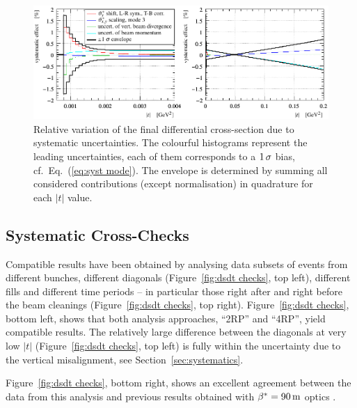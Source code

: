 \begin{figure}
\begin{center}
\includegraphics{fig/systematics_dgn_combination_summary.pdf}
\caption{%
Relative variation of the final differential cross-section due to systematic uncertainties. The colourful histograms represent the leading uncertainties, each of them corresponds to a $1\,{\rm \sigma}$ bias, cf.~Eq.~(\ref{eq:syst mode}). The envelope is determined by summing all considered contributions (except normalisation) in quadrature for each $|t|$ value.
}
\label{fig:syst unc}
\end{center}
\end{figure}





\subsection{Systematic Cross-Checks}
\label{sec:cross checks}

Compatible results have been obtained by analysing data subsets of events from different bunches, different diagonals (Figure~\ref{fig:dsdt checks}, top left), different fills and different time periods -- in particular those right after and right before the beam cleanings (Figure~\ref{fig:dsdt checks}, top right). Figure~\ref{fig:dsdt checks}, bottom left, shows that both analysis approaches, ``2RP'' and ``4RP'', yield compatible results. The relatively large difference between the diagonals at very low $|t|$ (Figure~\ref{fig:dsdt checks}, top left) is fully within the uncertainty due to the vertical misalignment, see Section~\ref{sec:systematics}.

Figure~\ref{fig:dsdt checks}, bottom right, shows an excellent agreement between the data from this analysis and previous results obtained with $\beta^* = 90\,{\rm m}$ optics \cite{totem-13tev-90m}.


